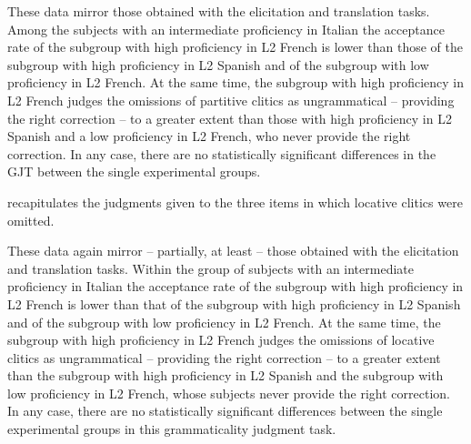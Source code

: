 \documentclass[output=paper,modfonts,nonflat,newtxmath]{langsci/langscibook}
\begin{document}
These data mirror those obtained with the elicitation and translation tasks. Among the subjects with an intermediate proficiency in Italian the acceptance rate of the subgroup with high proficiency in L2 French is lower than those of the subgroup with high proficiency in L2 Spanish and of the subgroup with low proficiency in L2 French. At the same time, the subgroup with high proficiency in L2 French  judges the omissions of partitive clitics as ungrammatical – providing the right correction – to a greater extent than those with high proficiency in L2 Spanish and a low proficiency in L2 French, who never provide the right correction. In any case, there are no statistically significant differences in the GJT between the single experimental groups.

 recapitulates the judgments given to the three items in which locative clitics were omitted.

\begin{table}
\caption{\label{tab:sciutti:5} Judgments on items including an omission of a locative clitic (ungrammatical)}
\end{table}

These data again mirror – partially, at least – those obtained with the elicitation and translation tasks. Within the group of subjects with an intermediate proficiency in Italian the acceptance rate of the subgroup with high proficiency in L2 French is lower than that of the subgroup with high proficiency in L2 Spanish and of the subgroup with low proficiency in L2 French. At the same time, the subgroup with high proficiency in L2 French  judges the omissions of locative clitics as ungrammatical – providing the right correction – to a greater extent than the subgroup with high proficiency in L2 Spanish and the subgroup with low proficiency in L2 French, whose subjects never provide the right correction. In any case, there are no statistically significant differences between the single experimental groups in this grammaticality judgment task.
\end{document}
